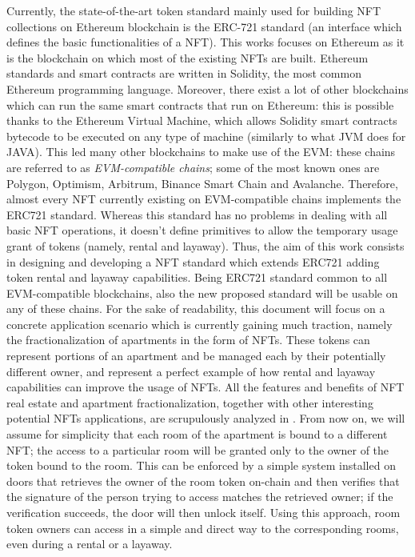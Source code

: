 \documentclass[english, LaM, oneside]{sapthesis}%
\begin{document}
Currently, the state-of-the-art token standard mainly used for building NFT collections on Ethereum blockchain is the ERC-721 standard\cite{ref:EIP721} (an interface which defines the basic functionalities of a NFT). This works focuses on Ethereum as it is the blockchain on which most of the existing NFTs are built. Ethereum standards and smart contracts are written in Solidity, the most common Ethereum programming language. Moreover, there exist a lot of other blockchains which can run the same smart contracts that run on Ethereum: this is possible thanks to the Ethereum Virtual Machine\cite{ref:EVM}, which allows Solidity smart contracts bytecode to be executed on any type of machine (similarly to what JVM does for JAVA). This led many other blockchains to make use of the EVM: these chains are referred to as \textit{EVM-compatible chains}; some of the most known ones are Polygon, Optimism, Arbitrum, Binance Smart Chain and Avalanche. Therefore, almost every NFT currently existing on EVM-compatible chains implements the ERC721 standard.
Whereas this standard has no problems in dealing with all basic NFT operations, it doesn't define primitives to allow the temporary usage grant of tokens (namely, rental and layaway).\newline
Thus, the aim of this work consists in designing and developing a NFT standard which extends ERC721 adding token rental and layaway capabilities. Being ERC721 standard common to all EVM-compatible blockchains, also the new proposed standard will be usable on any of these chains.\newline
For the sake of readability, this document will focus on a concrete application scenario which is currently gaining much traction, namely the fractionalization of apartments in the form of NFTs. These tokens can represent portions of an apartment and be managed each by their potentially different owner, and represent a perfect example of how rental and layaway capabilities can improve the usage of NFTs. All the features and benefits of NFT real estate and apartment fractionalization, together with other interesting potential NFTs applications, are scrupulously analyzed in \cite{ref:NFT applications}.
From now on, we will assume for simplicity that each room of the apartment is bound to a different NFT; the access to a particular room will be granted only to the owner of the token bound to the room. This can be enforced by a simple system installed on doors that retrieves the owner of the room token on-chain and then verifies that the signature of the person trying to access matches the retrieved owner; if the verification succeeds, the door will then unlock itself. Using this approach, room token owners can access in a simple and direct way to the corresponding rooms, even during a rental or a layaway.
\end{document}

